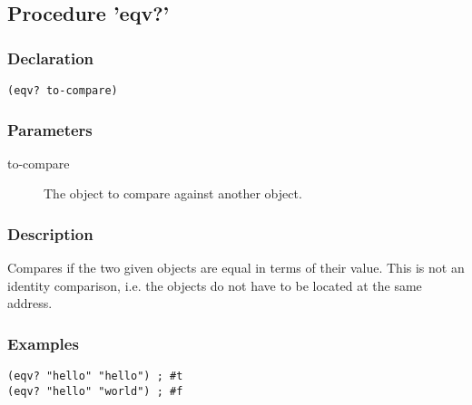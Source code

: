 \subsection{Procedure 'eqv?'}
\label{builtins/eqv}

\subsubsection*{Declaration}
\begin{lstlisting}
(eqv? to-compare)
\end{lstlisting}

\subsubsection*{Parameters}
\begin{description}
	\item[to-compare] The object to compare against another object.
\end{description}

\subsubsection*{Description}
Compares if the two given objects are equal in terms of their value. This is not an identity comparison, i.e. the objects do not have to be located at the same address.

\subsubsection*{Examples}
\begin{lstlisting}
(eqv? "hello" "hello") ; #t
(eqv? "hello" "world") ; #f
\end{lstlisting}
